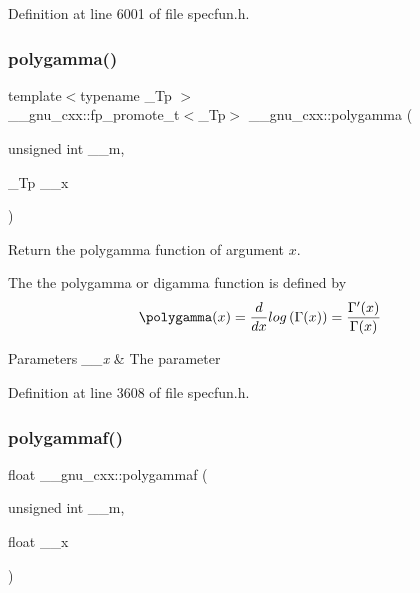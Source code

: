Definition at line 6001 of file specfun.\+h.

\mbox{\label{group__gnu__math__spec__func_ga65e674e7fe1457e819897e0d608c18b8}} 
\subsubsection{\texorpdfstring{polygamma()}{polygamma()}}
{\footnotesize\ttfamily template$<$typename \+\_\+\+Tp $>$ \\
\+\_\+\+\_\+gnu\+\_\+cxx\+::fp\+\_\+promote\+\_\+t$<$\+\_\+\+Tp$>$ \+\_\+\+\_\+gnu\+\_\+cxx\+::polygamma (\begin{DoxyParamCaption}\item[{unsigned int}]{\+\_\+\+\_\+m,  }\item[{\+\_\+\+Tp}]{\+\_\+\+\_\+x }\end{DoxyParamCaption})\hspace{0.3cm}{\ttfamily [inline]}}

Return the polygamma function of argument $ x $.

The the polygamma or digamma function is defined by \[ \polygamma(x) = \frac{d}{dx}log\left(\Gamma(x)\right) = \frac{\Gamma'(x)}{\Gamma(x)} \]


\begin{DoxyParams}{Parameters}
{\em \+\_\+\+\_\+x} & The parameter \\
\hline
\end{DoxyParams}


Definition at line 3608 of file specfun.\+h.

\mbox{\label{group__gnu__math__spec__func_ga91861fadef76d4f73afacffcac66e312}} 
\subsubsection{\texorpdfstring{polygammaf()}{polygammaf()}}
{\footnotesize\ttfamily float \+\_\+\+\_\+gnu\+\_\+cxx\+::polygammaf (\begin{DoxyParamCaption}\item[{unsigned int}]{\+\_\+\+\_\+m,  }\item[{float}]{\+\_\+\+\_\+x }\end{DoxyParamCaption})\hspace{0.3cm}{\ttfamily [inline]}}

